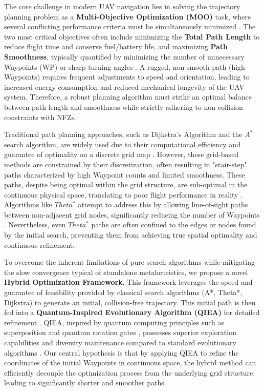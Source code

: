 The core challenge in modern UAV navigation lies in solving the trajectory planning problem as a \textbf{Multi-Objective Optimization (MOO)} task, where several conflicting performance criteria must be simultaneously minimized \cite{ref3}. The two most critical objectives often include minimizing the \textbf{Total Path Length} to reduce flight time and conserve fuel/battery life, and maximizing \textbf{Path Smoothness}, typically quantified by minimizing the number of unnecessary Waypoints (WP) or sharp turning angles \cite{ref4}. A rugged, non-smooth path (high Waypoints) requires frequent adjustments to speed and orientation, leading to increased energy consumption and reduced mechanical longevity of the UAV system. Therefore, a robust planning algorithm must strike an optimal balance between path length and smoothness while strictly adhering to non-collision constraints with NFZs.


Traditional path planning approaches, such as Dijkstra's Algorithm and the $A^{*}$ search algorithm, are widely used due to their computational efficiency and guarantee of optimality on a discrete grid map \cite{ref5}. However, these grid-based methods are constrained by their discretization, often resulting in "stair-step" paths characterized by high Waypoint counts and limited smoothness. These paths, despite being optimal within the grid structure, are sub-optimal in the continuous physical space, translating to poor flight performance in reality \cite{ref6}. Algorithms like $Theta^{*}$ attempt to address this by allowing line-of-sight paths between non-adjacent grid nodes, significantly reducing the number of Waypoints \cite{ref7}. Nevertheless, even $Theta^{*}$ paths are often confined to the edges or nodes found by the initial search, preventing them from achieving true spatial optimality and continuous refinement.

To overcome the inherent limitations of pure search algorithms while mitigating the slow convergence typical of standalone metaheuristics, we propose a novel \textbf{Hybrid Optimization Framework}. This framework leverages the speed and guarantee of feasibility provided by classical search algorithms (A*, Theta*, Dijkstra) to generate an initial, collision-free trajectory. This initial path is then fed into a \textbf{Quantum-Inspired Evolutionary Algorithm (QIEA)} for detailed refinement \cite{ref8}. QIEA, inspired by quantum computing principles such as superposition and quantum rotation gates \cite{ref9}, possesses superior exploration capabilities and diversity maintenance compared to standard evolutionary algorithms \cite{ref10}. Our central hypothesis is that by applying QIEA to refine the coordinates of the initial Waypoints in continuous space, the hybrid method can efficiently decouple the optimization process from the underlying grid structure, leading to significantly shorter and smoother paths.



